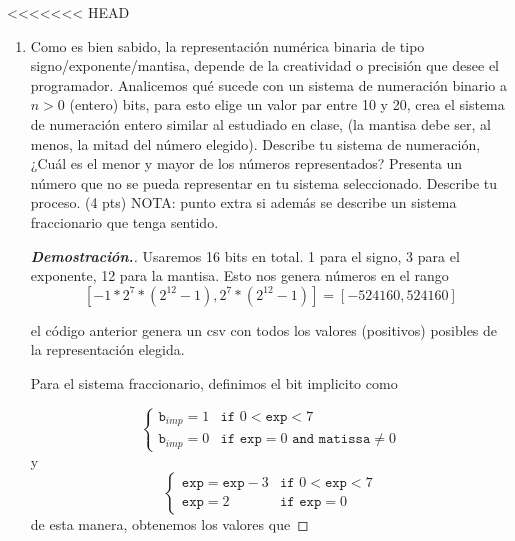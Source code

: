 \documentclass{article}
\begin{document}
<<<<<<< HEAD

\begin{enumerate}


	\item Como es bien sabido, la representaci\'on num\'erica binaria de tipo signo/exponente/mantisa, depende de la creatividad o precisi\'on que desee el programador. Analicemos qu\'e sucede con un sistema de numeraci\'on binario a $n>0$ (entero) bits, para esto elige un valor par entre 10 y 20, crea el sistema de numeraci\'on entero similar al estudiado en clase, (la mantisa debe ser, al menos, la mitad del n\'umero elegido). Describe tu sistema de numeraci\'on, ¿Cu\'al es el menor y mayor de los n\'umeros representados? Presenta un n\'umero que no se pueda representar en tu sistema seleccionado. Describe tu proceso. (4 pts) NOTA: punto extra si adem\'as se describe un sistema fraccionario que tenga sentido.
	      \begin{mdframed}[
			      linecolor=darkgray,
			      backgroundcolor=white]
		      \begin{proof}[\textbf{Demostraci\'on.}]
			      Usaremos 16 bits en total. 1 para el signo, 3 para el exponente, 12 para la mantisa. Esto nos genera n\'umeros en el rango
			      \[ [-1*2^7*(2^{12} - 1), 2^7*(2^{12} - 1)] = [-524160, 524160] \]

			      


			      el c\'odigo anterior genera un csv con todos los valores (positivos) posibles de la representaci\'on elegida.

			      Para el sistema fraccionario, definimos el bit implicito como

			      $$
				      \begin{cases}
					      \texttt{b}_{imp}= 1   & \texttt{if } 0 <\texttt{exp} < 7                           \\
					      \texttt{b}_{imp} =  0 & \texttt{if } \texttt{exp} = 0 \texttt{ and matissa} \neq 0
				      \end{cases}
			      $$
			      y
			      $$
				      \begin{cases}
					      \texttt{exp}=\texttt{exp}-3 & \texttt{if } 0 <\texttt{exp} < 7 \\
					      \texttt{exp} = 2            & \texttt{if } \texttt{exp} = 0
				      \end{cases}
			      $$
			      de esta manera, obtenemos los valores que


\end{proof}
\end{mdframed}
\end{enumerate}
\end{document}
